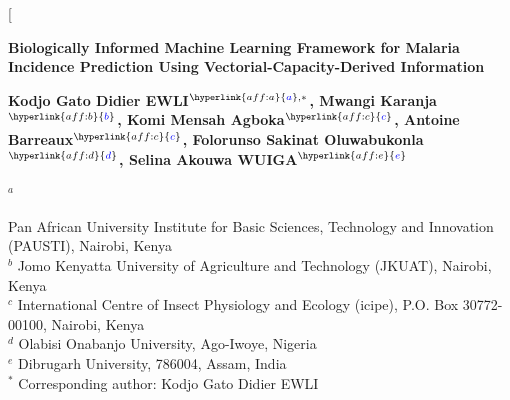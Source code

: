 \documentclass[10pt,twocolumn]{article}
\begin{document}

\twocolumn[


\noindent
{\fontsize{17}{20}\selectfont\bfseries
Biologically Informed Machine Learning Framework for Malaria Incidence
Prediction Using Vectorial-Capacity-Derived Information
\par}

\vspace{0.8em}


\noindent
{\large\bfseries
Kodjo Gato Didier EWLI$^{\hyperlink{aff:a}{\textcolor{blue}{a}},*}$,
Mwangi Karanja$^{\hyperlink{aff:b}{\textcolor{blue}{b}}}$,
Komi Mensah Agboka$^{\hyperlink{aff:c}{\textcolor{blue}{c}}}$,
Antoine Barreaux$^{\hyperlink{aff:c}{\textcolor{blue}{c}}}$,
Folorunso Sakinat Oluwabukonla$^{\hyperlink{aff:d}{\textcolor{blue}{d}}}$,
Selina Akouwa WUIGA$^{\hyperlink{aff:e}{\textcolor{blue}{e}}}$
\par}

\vspace{0.5em}


\noindent
{\footnotesize
\hypertarget{aff:a}{$^{a}$} Pan African University Institute for Basic Sciences,
Technology and Innovation (PAUSTI), Nairobi, Kenya\\
\hypertarget{aff:b}{$^{b}$} Jomo Kenyatta University of Agriculture and Technology
(JKUAT), Nairobi, Kenya\\
\hypertarget{aff:c}{$^{c}$} International Centre of Insect Physiology and Ecology
(icipe), P.O. Box 30772-00100, Nairobi, Kenya\\
\hypertarget{aff:d}{$^{d}$} Olabisi Onabanjo University, Ago-Iwoye, Nigeria\\
\hypertarget{aff:e}{$^{e}$} Dibrugarh University, 786004, Assam, India\\\vspace{2pt}
$^{*}$ Corresponding author: Kodjo Gato Didier EWLI
\par}
\end{document}
